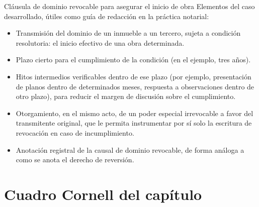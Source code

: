 \documentclass[12pt,oneside]{book}
\begin{document}
\begin{example}{Cláusula de dominio revocable para asegurar el inicio de obra}
Elementos del caso desarrollado, útiles como guía de redacción en la práctica notarial:
\begin{itemize}
    \item Transmisión del dominio de un inmueble a un tercero, sujeta a condición resolutoria: el inicio efectivo de una obra determinada.
    \item Plazo cierto para el cumplimiento de la condición (en el ejemplo, tres años).
    \item Hitos intermedios verificables dentro de ese plazo (por ejemplo, presentación de planos dentro de determinados meses, respuesta a observaciones dentro de otro plazo), para reducir el margen de discusión sobre el cumplimiento.
    \item Otorgamiento, en el mismo acto, de un poder especial irrevocable a favor del transmitente original, que le permita instrumentar por sí solo la escritura de revocación en caso de incumplimiento.
    \item Anotación registral de la causal de dominio revocable, de forma análoga a como se anota el derecho de reversión.
\end{itemize}
\end{example}

\section{Cuadro Cornell del capítulo}
\end{document}
